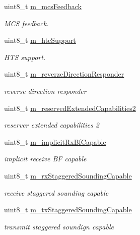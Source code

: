 \begin{DoxyCompactItemize}
uint8\+\_\+t \hyperlink{classns3_1_1HtCapabilities_ab38ccae8373c2f12916d3c1d499ac1ce}{m\+\_\+mcs\+Feedback}
\begin{DoxyCompactList}\small\item\em M\+CS feedback. \end{DoxyCompactList}\item 
uint8\+\_\+t \hyperlink{classns3_1_1HtCapabilities_a05ab5b1b8e8d752ec98e0cfec431f19b}{m\+\_\+htc\+Support}
\begin{DoxyCompactList}\small\item\em H\+TS support. \end{DoxyCompactList}\item 
uint8\+\_\+t \hyperlink{classns3_1_1HtCapabilities_a99da7560f5302107f3835e09940aeddb}{m\+\_\+reverze\+Direction\+Responder}
\begin{DoxyCompactList}\small\item\em reverse direction responder \end{DoxyCompactList}\item 
uint8\+\_\+t \hyperlink{classns3_1_1HtCapabilities_a04a1a23f406df613792660caf8ef24b7}{m\+\_\+reserved\+Extended\+Capabilities2}
\begin{DoxyCompactList}\small\item\em reserver extended capabilities 2 \end{DoxyCompactList}\item 
uint8\+\_\+t \hyperlink{classns3_1_1HtCapabilities_aab2257b1ed21afbdf9461f7279d2467c}{m\+\_\+implicit\+Rx\+Bf\+Capable}
\begin{DoxyCompactList}\small\item\em implicit receive BF capable \end{DoxyCompactList}\item 
uint8\+\_\+t \hyperlink{classns3_1_1HtCapabilities_a2800a2c035cf78f10fc1bfb9869d8428}{m\+\_\+rx\+Staggered\+Sounding\+Capable}
\begin{DoxyCompactList}\small\item\em receive staggered sounding capable \end{DoxyCompactList}\item 
uint8\+\_\+t \hyperlink{classns3_1_1HtCapabilities_a56b848fe6b83dd90cce1bc79ab9a85a6}{m\+\_\+tx\+Staggered\+Sounding\+Capable}
\begin{DoxyCompactList}\small\item\em transmit staggered soundign capable \end{DoxyCompactList}\item 

\end{DoxyCompactItemize}
